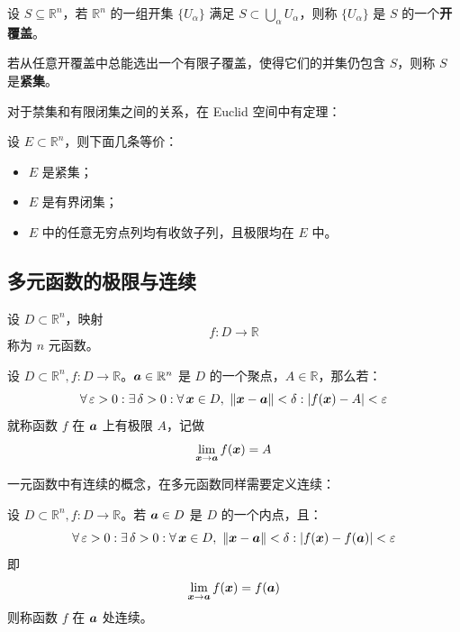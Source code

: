 \begin{definition}
    设 $S \subseteq \mathbb{R}^{n}$，若 $\mathbb{R}^{n}$ 的一组开集 $\{U_\alpha\}$ 满足 $S \subset \bigcup_{\alpha} U_\alpha$，则称 $\{U_\alpha\}$ 是 $S$ 的一个\textbf{开覆盖}。
    
    若从任意开覆盖中总能选出一个有限子覆盖，使得它们的并集仍包含 $S$，则称 $S$ 是\textbf{紧集}。
\end{definition}

对于禁集和有限闭集之间的关系，在 Euclid 空间中有定理：

\begin{theorem}
    设 $E \subset \mathbb{R}^n$，则下面几条等价：
    \begin{itemize}
        \item $E$ 是紧集；
        \item $E$ 是有界闭集；
        \item $E$ 中的任意无穷点列均有收敛子列，且极限均在 $E$ 中。
    \end{itemize}
\end{theorem}

\subsection{多元函数的极限与连续}

\begin{definition}[多元函数]
    设 $D \subset \mathbb{R}^n$，映射
    $$
    f: D \to \mathbb{R}
    $$
    称为 $n$ 元函数。
\end{definition}

\begin{definition}[多元函数极限]
    设 $D \subset \mathbb{R}^{n}, f: D \to \mathbb{R}$。$\boldsymbol{a} \in \mathbb{R}^{n}$ 是 $D$ 的一个聚点，$A \in \mathbb{R}$，那么若：
    $$
    \forall\,\varepsilon > 0: \exists\,\delta > 0: \forall\,\boldsymbol{x} \in D,\ \norm{\boldsymbol{x} - \boldsymbol{a}} < \delta: \abs{f(\boldsymbol{x}) - A} < \varepsilon
    $$
    就称函数 $f$ 在 $\boldsymbol{a}$ 上有极限 $A$，记做
    $$
    \lim_{\boldsymbol{x} \to \boldsymbol{a}} f(\boldsymbol{x}) = A
    $$
\end{definition}

一元函数中有连续的概念，在多元函数同样需要定义连续：

\begin{definition}[多元函数连续]
    设 $D \subset \mathbb{R}^{n}, f: D \to \mathbb{R}$。若 $\boldsymbol{a} \in D$ 是 $D$ 的一个内点，且：
    $$
    \forall\,\varepsilon > 0: \exists\,\delta > 0: \forall\,\boldsymbol{x} \in D,\ \norm{\boldsymbol{x} - \boldsymbol{a}} < \delta: \abs{f(\boldsymbol{x}) - f(\boldsymbol{a})} < \varepsilon
    $$
    即
    $$
    \lim_{\boldsymbol{x} \to \boldsymbol{a}} f(\boldsymbol{x}) = f(\boldsymbol{a})
    $$
    则称函数 $f$ 在 $\boldsymbol{a}$ 处连续。
\end{definition}


